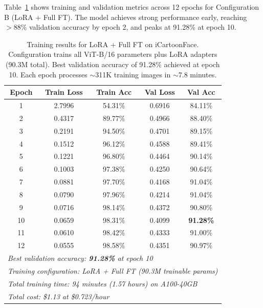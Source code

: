 \documentclass[11pt]{article}
\begin{document}
Table~\ref{tab:training-progress} shows training and validation metrics across 12 epochs for Configuration B (LoRA + Full FT). The model achieves strong performance early, reaching $>88\%$ validation accuracy by epoch 2, and peaks at 91.28\% at epoch 10.

\begin{table}[H]
\centering
\small
\begin{tabular}{ccccc}
\toprule
\textbf{Epoch} & \textbf{Train Loss} & \textbf{Train Acc} & \textbf{Val Loss} & \textbf{Val Acc} \\
\midrule
1 & 2.7996 & 54.31\% & 0.6916 & 84.11\% \\
2 & 0.4317 & 89.77\% & 0.4966 & 88.40\% \\
3 & 0.2191 & 94.50\% & 0.4701 & 89.15\% \\
4 & 0.1512 & 96.12\% & 0.4588 & 89.41\% \\
5 & 0.1221 & 96.80\% & 0.4464 & 90.14\% \\
6 & 0.1003 & 97.38\% & 0.4250 & 90.64\% \\
7 & 0.0881 & 97.70\% & 0.4168 & 91.04\% \\
8 & 0.0790 & 97.96\% & 0.4214 & 91.04\% \\
9 & 0.0716 & 98.14\% & 0.4372 & 90.80\% \\
10 & 0.0659 & 98.31\% & 0.4099 & \textbf{91.28\%} \\
11 & 0.0610 & 98.42\% & 0.4333 & 91.00\% \\
12 & 0.0555 & 98.58\% & 0.4351 & 90.97\% \\
\midrule
\multicolumn{5}{l}{\textit{Best validation accuracy: \textbf{91.28\%} at epoch 10}} \\
\multicolumn{5}{l}{\textit{Training configuration: LoRA + Full FT (90.3M trainable params)}} \\
\multicolumn{5}{l}{\textit{Total training time: 94 minutes (1.57 hours) on A100-40GB}} \\
\multicolumn{5}{l}{\textit{Total cost: \$1.13 at \$0.723/hour}} \\
\bottomrule
\end{tabular}
\caption{Training results for LoRA + Full FT on iCartoonFace. Configuration trains all ViT-B/16 parameters plus LoRA adapters (90.3M total). Best validation accuracy of 91.28\% achieved at epoch 10. Each epoch processes $\sim$311K training images in $\sim$7.8 minutes.}
\label{tab:training-progress}
\end{table}
\end{document}
